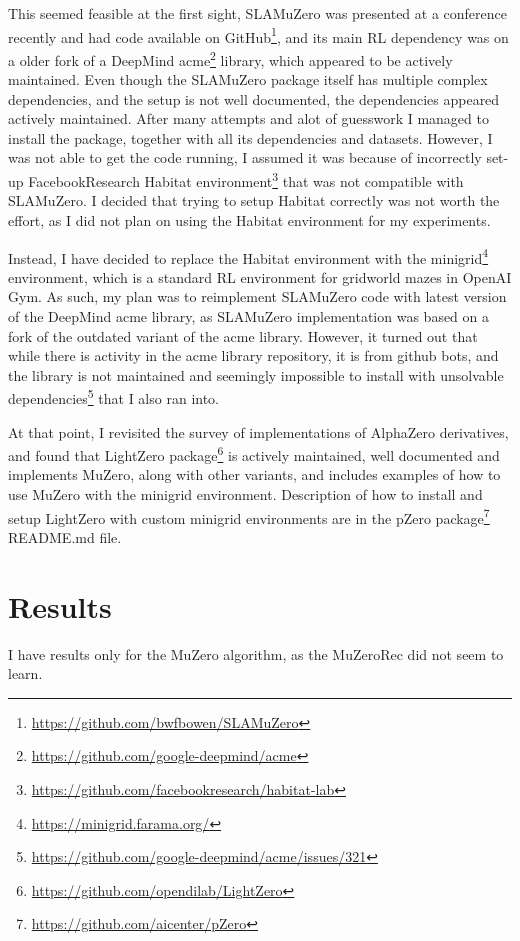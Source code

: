 \documentclass[12pt]{article}
\begin{document}
This seemed feasible at the first sight, SLAMuZero was presented at a conference recently and had code available on GitHub\footnote{\url{https://github.com/bwfbowen/SLAMuZero}}, and its main RL dependency was on a older fork of a DeepMind acme\footnote{\url{https://github.com/google-deepmind/acme}} library, which appeared to be actively maintained. Even though the SLAMuZero package itself has multiple complex dependencies, and the setup is not well documented, the dependencies appeared actively maintained. After many attempts and alot of guesswork I managed to install the package, together with all its dependencies and datasets. However, I was not able to get the code running, I assumed it was because of incorrectly set-up FacebookResearch Habitat environment\footnote{\url{https://github.com/facebookresearch/habitat-lab}} that was not compatible with SLAMuZero. I decided that trying to setup Habitat correctly was not worth the effort, as I did not plan on using the Habitat environment for my experiments.

Instead, I have decided to replace the Habitat environment with the minigrid\footnote{\url{https://minigrid.farama.org/}} environment, which is a standard RL environment for gridworld mazes in OpenAI Gym. As such, my plan was to reimplement SLAMuZero code with latest version of the DeepMind acme library, as SLAMuZero implementation was based on a fork of the outdated variant of the acme library. However, it turned out that while there is activity in the acme library repository, it is from github bots, and the library is not maintained and seemingly impossible to install with unsolvable dependencies\footnote{\url{https://github.com/google-deepmind/acme/issues/321}} that I also ran into.

At that point, I revisited the survey of implementations of AlphaZero derivatives, and found that LightZero package\footnote{\url{https://github.com/opendilab/LightZero}} is actively maintained, well documented and implements MuZero, along with other variants, and includes examples of how to use MuZero with the minigrid environment. Description of how to install and setup LightZero with custom minigrid environments are in the pZero package\footnote{\url{https://github.com/aicenter/pZero}} README.md file.

\section{Results}
I have results only for the MuZero algorithm, as the MuZeroRec did not seem to learn. 

\printbibliography
\end{document}
